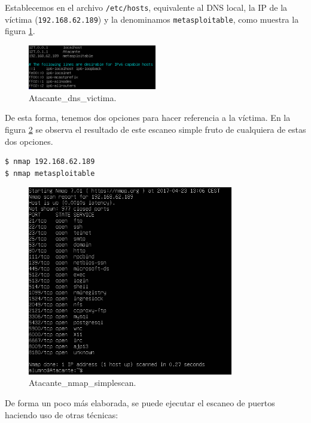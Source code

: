 \documentclass[a4,12pt,onecolum]{article}
\begin{document}
Establecemos en el archivo \texttt{/etc/hosts}, equivalente al DNS local, la IP de la víctima (\texttt{192.168.62.189}) y la denominamos \texttt{metasploitable}, como muestra la figura \ref{fig:nmap1}. \\

\begin{figure}[htbp]
\centering
\includegraphics[width=0.5\textwidth]{./images/Atacante_dns_victima.png}
\caption{Atacante\_dns\_victima.}
\label{fig:nmap1}
\end{figure}

De esta forma, tenemos dos opciones para hacer referencia a la víctima. En la figura \ref{fig:nmap2} se observa el resultado de este escaneo simple fruto de cualquiera de estas dos opciones.

\begin{verbatim}
$ nmap 192.168.62.189
$ nmap metasploitable
\end{verbatim}

\begin{figure}[htbp]
\centering
\includegraphics[width=0.8\textwidth]{./images/Atacante_nmap_simplescan.png}
\caption{Atacante\_nmap\_simplescan.}
\label{fig:nmap2}
\end{figure}

De forma un poco más elaborada, se puede ejecutar el escaneo de puertos haciendo uso de otras técnicas:
\end{document}
